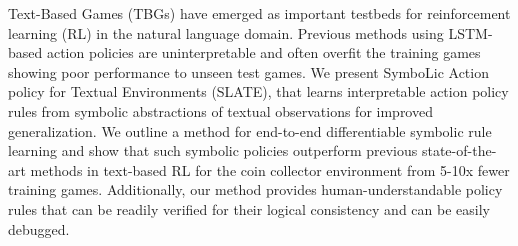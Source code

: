 Text-Based Games (TBGs) have emerged as important testbeds for reinforcement learning (RL) in the natural language domain. Previous methods using LSTM-based action policies are uninterpretable and often overfit the training games showing poor performance to unseen test games. We present SymboLic Action policy for Textual Environments (SLATE), that learns interpretable action policy rules from symbolic abstractions of textual observations for improved generalization. We outline a method for end-to-end differentiable symbolic rule learning and show that such symbolic policies outperform previous state-of-the-art methods in text-based RL for the coin collector environment from 5-10x fewer training games. Additionally, our method provides human-understandable policy rules that can be readily verified for their logical consistency and can be easily debugged.
